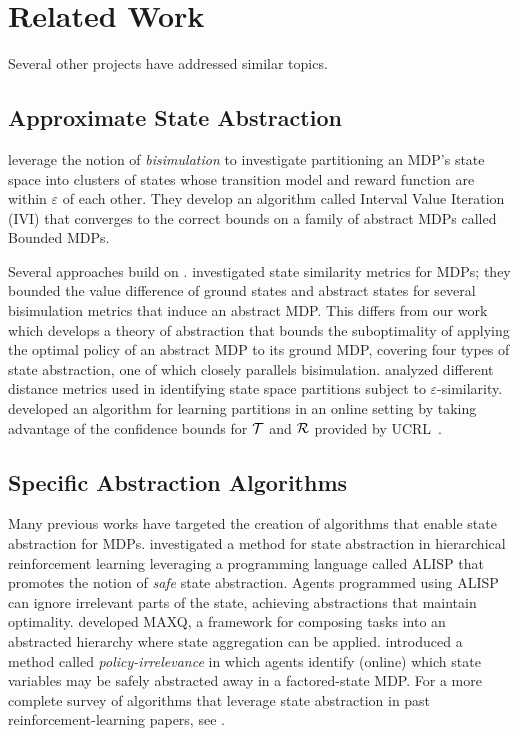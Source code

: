 \section{Related Work}

Several other projects have addressed similar topics.

\subsection{Approximate State Abstraction}
\citet{dean1997model} leverage the notion of {\it bisimulation} to investigate partitioning an \ac{MDP}'s state space into clusters of states whose transition model and reward function are within $\varepsilon$ of each other. They develop an algorithm called Interval Value Iteration (IVI) that converges to the correct bounds on a family of abstract MDPs called Bounded \acp{MDP}.

Several approaches build on \citet{dean1997model}. \citet{ferns2004metrics,ferns2006methods} investigated state similarity metrics for \acp{MDP}; they bounded the value difference of ground states and abstract states for several bisimulation metrics that induce an abstract MDP. This differs from our work which develops a theory of abstraction that bounds the suboptimality of applying the optimal policy of an abstract MDP to its ground MDP, covering four types of state abstraction, one of which closely parallels bisimulation. \citet{even2003approximate} analyzed different distance metrics used in identifying state space partitions subject to $\varepsilon$-similarity. \citet{ortner2013adaptive} developed an algorithm for learning partitions in an online setting by taking advantage of the confidence bounds for $\mathcal{T}$ and $\mathcal{R}$ provided by UCRL~\cite{auer2009near}.

\subsection{Specific Abstraction Algorithms}
Many previous works have targeted the creation of algorithms that enable state abstraction for MDPs. \citet{andre2002state} investigated a method for state abstraction in hierarchical reinforcement learning leveraging a programming language called ALISP that promotes the notion of {\it safe} state abstraction. Agents programmed using ALISP can ignore irrelevant parts of the state, achieving abstractions that maintain optimality. \citet{dietterich2000hierarchical} developed MAXQ, a framework for composing tasks into an abstracted hierarchy where state aggregation can be applied. \citet{jong2005state} introduced a method called {\it policy-irrelevance} in which agents identify (online) which state variables may be safely abstracted away in a factored-state \ac{MDP}. For a more complete survey of algorithms that leverage state abstraction in past reinforcement-learning papers, see \citet{li2006towards}.

